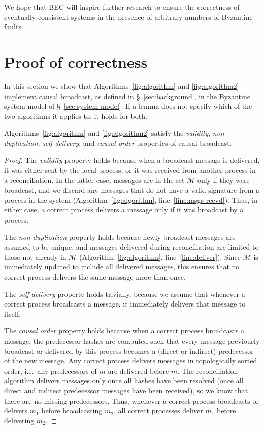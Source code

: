 \documentclass[a4paper,anonymous,USenglish]{lipics-v2019}
\begin{document}
We hope that BEC will inspire further research to ensure the correctness of eventually consistent systems in the presence of arbitrary numbers of Byzantine faults.



\newpage\appendix

\section{Proof of correctness}\label{sec:proof}

In this section we show that Algorithms~\ref{fig:algorithm} and \ref{fig:algorithm2} implement causal broadcast, as defined in \S~\ref{sec:background}, in the Byzantine system model of \S~\ref{sec:system-model}.
If a lemma does not specify which of the two algorithms it applies to, it holds for both.

\begin{lemma}\label{lemma:easy-properties}
Algorithms~\ref{fig:algorithm} and \ref{fig:algorithm2} satisfy the \emph{validity}, \emph{non-duplication}, \emph{self-delivery}, and \emph{causal order} properties of causal broadcast.
\end{lemma}
\begin{proof}
The \emph{validity} property holds because when a broadcast message is delivered, it was either sent by the local process, or it was received from another process in a reconciliation.
In the latter case, messages are in the set $\mathcal{M}$ only if they were broadcast, and we discard any messages that do not have a valid signature from a process in the system (Algorithm~\ref{fig:algorithm}, line~\ref{line:msgs-recvd}).
Thus, in either case, a correct process delivers a message only if it was broadcast by a process.

The \emph{non-duplication} property holds because newly broadcast messages are assumed to be unique, and messages delivered during reconciliation are limited to those not already in $\mathcal{M}$ (Algorithm~\ref{fig:algorithm}, line~\ref{line:deliver}).
Since $\mathcal{M}$ is immediately updated to include all delivered messages, this ensures that no correct process delivers the same message more than once.

The \emph{self-delivery} property holds trivially, because we assume that whenever a correct process broadcasts a message, it immediately delivers that message to itself.

The \emph{causal order} property holds because when a correct process broadcasts a message, the predecessor hashes are computed such that every message previously broadcast or delivered by this process becomes a (direct or indirect) predecessor of the new message.
Any correct process delivers messages in topologically sorted order, i.e.\ any predecessors of $m$ are delivered before $m$.
The reconciliation algorithm delivers messages only once all hashes have been resolved (once all direct and indirect predecessor messages have been received), so we know that there are no missing predecessors.
Thus, whenever a correct process broadcasts or delivers $m_1$ before broadcasting $m_2$, all correct processes deliver $m_1$ before delivering $m_2$.
\end{proof}
\end{document}
